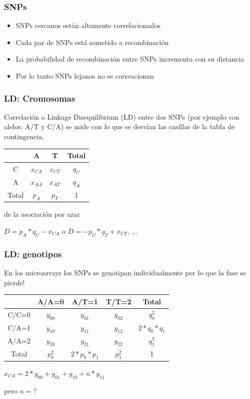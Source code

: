 \documentclass{beamer}\usepackage[]{graphicx}\usepackage[]{color}
\begin{document}
\begin{frame}[fragile] 
\frametitle{SNPs}

\begin{itemize}
  \item SNPs cercanos est\'an altamente correlacionados
  \item Cada par de SNPs est\'a sometido a recombinaci\'on
  \item La probabilidad de recombinaci\'on entre SNPs incrementa con su distancia
  \item Por lo tanto SNPs lejanos no se correacionan 
\end{itemize}

\end{frame}



\begin{frame}[fragile] 
\frametitle{LD: Cromosomas}

Correlaci\'on o Linkage Disequilibrium (LD) entre dos SNPs (por ejemplo con alelos: A/T y C/A) se mide con lo que se desv\'ian las casillas de la tabla de contingencia,

\begin{table}[]
\centering
\begin{tabular}{c|cc|c}
  & A & T &  Total \\ \hline
C &  $x_{CA}$  &  $x_{CT}$  &  $q_C$ \\
A &  $x_{AA}$  &  $x_{AT}$  &  $q_A$  \\ \hline
Total & $p_A$  &  $p_T$  &   1 \\
\end{tabular}
\end{table}
de la asociaci\'on por azar

$D=p_A*q_C - x_{CA}$ o $D=-p_C*q_T + x_{CT}$, ...
\end{frame}


\begin{frame}[fragile] 
\frametitle{LD: genotipos}
En los microarrays los SNPs se genotipan individualmente por lo que la fase se pierde! 

\begin{table}[]
\centering
\begin{tabular}{c|ccc|c}
 & A/A=0 & A/T=1 & T/T=2 &  Total \\ \hline
C/C=0 &  $y_{00}$  &  $y_{01}$ & $y_{02}$ & $q_0^2$ \\
C/A=1 &  $y_{10}$  &  $y_{11}$ & $y_{12}$ & $2*q_0*q_1$  \\ 
A/A=2 &  $y_{20}$  &  $y_{21}$ & $y_{22}$ & $q_1^2$  \\ \hline
Total & $p_0^2$  &  $2*p_0*p_1$  & $p_1^2$ &   1 \\
\end{tabular}
\end{table}
$x_{CA} =2*y_{00} + y_{01} + y_{10} +n*y_{11}$ 

pero $n=?$ 
\end{frame}
\end{document}
